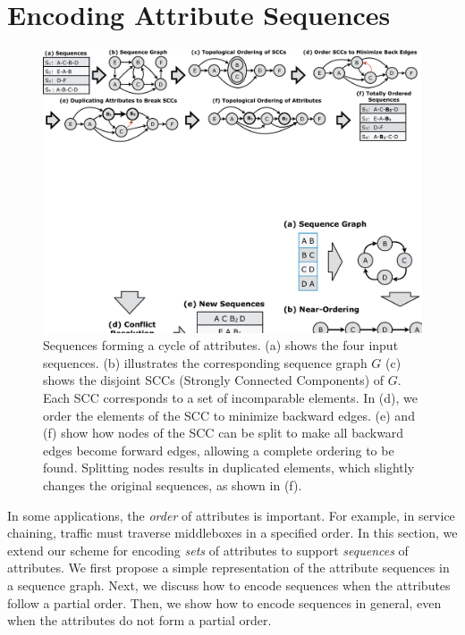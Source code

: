 \section{Encoding Attribute Sequences}
\label{sec:ordering}


\begin{figure}[t!]
\includegraphics[trim={0 18cm 0 0}, clip, width=\textwidth]{figures/partial_ordering2}
\caption{Sequences forming a cycle of attributes. (a) shows the four input sequences. (b) illustrates the corresponding sequence graph $G$ (c) shows the disjoint SCCs (Strongly Connected Components) of $G$. Each SCC corresponds to a set of incomparable elements. In (d), we order the elements of the SCC to minimize backward edges. (e) and (f) show how nodes of the SCC can be split to make all backward edges become forward edges, allowing a complete ordering to be found. Splitting nodes results in duplicated elements, which slightly changes the original sequences, as shown in (f).}
\label{fig:ordering}
\end{figure}

In some applications, the \emph{order} of attributes is important.  For example, in service chaining, traffic must traverse middleboxes in a specified order.  In this section, we extend our scheme for encoding \emph{sets} of attributes to support \textit{sequences} of attributes.  We first propose a simple representation of the attribute sequences in a sequence graph.  Next, we discuss how to encode sequences when the attributes follow a partial order.  Then, we show how to encode sequences in general, even when the attributes do not form a partial order.

